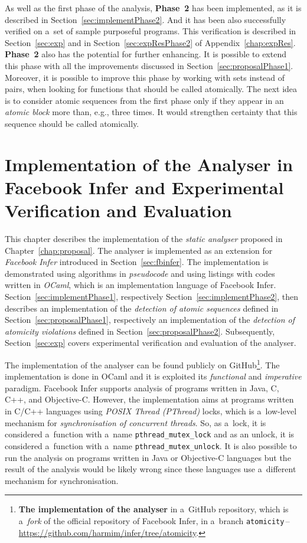 As well as the first phase of the analysis, \textbf{Phase~2} has been
implemented, as it is described in Section~\ref{sec:implementPhase2}.
And it has been also successfully verified on a~set of sample purposeful
programs. This verification is described in
Section~\ref{sec:exp} and in Section~\ref{sec:expResPhase2} of
Appendix~\ref{chap:expRes}. \textbf{Phase~2} also has the potential for
further enhancing. It is possible to extend this phase with all the
improvements discussed in Section~\ref{sec:proposalPhase1}. Moreover, it
is possible to improve this phase by working with sets instead of pairs,
when looking for functions that should be called atomically. The next idea
is to consider atomic sequences from the first phase only if they appear
in an \emph{atomic block} more than, e.g., three times. It would strengthen
certainty that this sequence should be called atomically.



\chapter{\texorpdfstring{%
    Implementation of the Analyser in Facebook Infer and Experimental
    Verification and Evaluation
}{}}
\label{chap:implementExp}

This chapter describes the implementation of the \emph{static analyser}
proposed in Chapter~\ref{chap:proposal}. The analyser is implemented as an
extension for \emph{Facebook Infer} introduced in Section~\ref{sec:fbinfer}.
The implementation is demonstrated using algorithms in \emph{pseudocode}
and using listings with codes written in \emph{OCaml}, which is an
implementation language of Facebook Infer. Section~\ref{sec:implementPhase1},
respectively Section~\ref{sec:implementPhase2}, then describes an
implementation of the \emph{detection of atomic sequences} defined in
Section~\ref{sec:proposalPhase1}, respectively an implementation of the
\emph{detection of atomicity violations} defined in
Section~\ref{sec:proposalPhase2}. Subsequently, Section~\ref{sec:exp}
covers experimental verification and evaluation of the analyser.

The implementation of the analyser can be found publicly on
GitHub\footnote{\textbf{The implementation of the analyser} in a~GitHub
repository, which is a~\emph{fork} of the official repository of Facebook
Infer, in a~branch
\texttt{atomicity}\,--\,\url{https://github.com/harmim/infer/tree/atomicity}.}.
The implementation is done in OCaml and it is exploited its \emph{functional}
and \emph{imperative} paradigm. Facebook Infer supports analysis of
programs written in Java, C, C++, and Objective-C. However, the implementation
aims at programs written in C/C++ languages using \emph{POSIX Thread
(PThread)} locks, which is a~low-level mechanism for \emph{synchronisation
of concurrent threads}. So, as a~lock, it is considered a~function with
a~name \texttt{pthread\_mutex\_lock} and as an unlock, it is considered
a~function with a~name \texttt{pthread\_mutex\_unlock}. It is also possible to
run the analysis on programs written in Java or Objective-C languages but
the result of the analysis would be likely wrong since these languages use
a~different mechanism for synchronisation.

